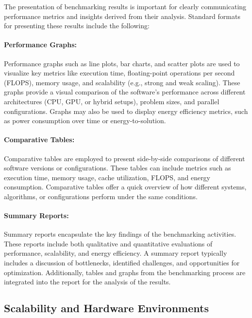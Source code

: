 The presentation of benchmarking results is important for clearly communicating performance metrics and insights derived from their analysis. Standard formats for presenting these results include the following:

\paragraph{Performance Graphs:} Performance graphs such as line plots, bar charts, and scatter plots are used to visualize key metrics like execution time, floating-point operations per second (FLOPS), memory usage, and scalability (e.g., strong and weak scaling). These graphs provide a visual comparison of the software's performance across different architectures (CPU, GPU, or hybrid setups), problem sizes, and parallel configurations. Graphs may also be used to display energy efficiency metrics, such as power consumption over time or energy-to-solution.

\paragraph{Comparative Tables:} Comparative tables are employed to present side-by-side comparisons of different software versions or configurations. These tables can include metrics such as execution time, memory usage, cache utilization, FLOPS, and energy consumption. Comparative tables offer a quick overview of how different systems, algorithms, or configurations perform under the same conditions.

\paragraph{Summary Reports:} Summary reports encapsulate the key findings of the benchmarking activities. These reports include both qualitative and quantitative evaluations of performance, scalability, and energy efficiency. A summary report typically includes a discussion of bottlenecks, identified challenges, and opportunities for optimization. Additionally, tables and graphs from the benchmarking process are integrated into the report for the analysis of the results.


\subsection{Scalability and Hardware Environments}
\label{sec:methodology-environments}

